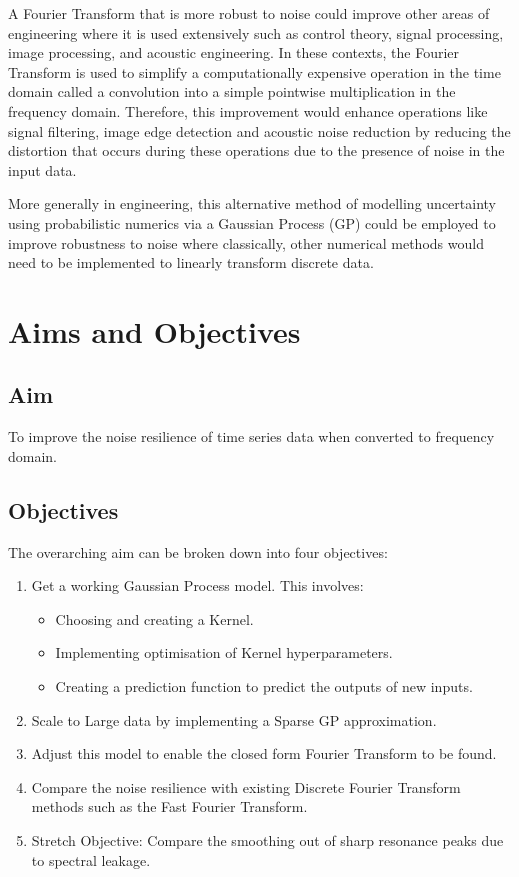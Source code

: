 \documentclass[12pt]{article}
\begin{document}
    A Fourier Transform that is more robust to noise could improve other areas of engineering where it is used extensively such as control theory, signal processing, image processing, and acoustic engineering.
    In these contexts, the Fourier Transform is used to simplify a computationally expensive operation in the time domain called a convolution into a simple pointwise multiplication in the frequency domain.
    Therefore, this improvement would enhance operations like signal filtering, image edge detection and acoustic noise reduction by reducing the distortion that occurs during these operations due to the presence of noise in the input data.


    More generally in engineering, this alternative method of modelling uncertainty using probabilistic numerics via a Gaussian Process (GP) could be employed to improve robustness to noise where classically, other numerical methods would need to be implemented to linearly transform discrete data.


    \section{Aims and Objectives}
    \subsection{Aim}
    To improve the noise resilience of time series data when converted to frequency domain.

    \subsection{Objectives}
    The overarching aim can be broken down into four objectives:
        \begin{enumerate}
            \item Get a working Gaussian Process model.
            This involves:
                \begin{itemize}
                    \item Choosing and creating a Kernel.
                    \item Implementing optimisation of Kernel hyperparameters. \label{item:nll}
                    \item Creating a prediction function to predict the outputs of new inputs. \label{item:predict}
                \end{itemize}
            \item Scale to Large data by implementing a Sparse GP approximation.
            \item Adjust this model to enable the closed form Fourier Transform to be found.
            \item Compare the noise resilience with existing Discrete Fourier Transform methods such as the Fast Fourier Transform.\label{noise-resiliance}
            \item Stretch Objective: Compare the smoothing out of sharp resonance peaks due to spectral leakage.\label{stretch-obj}
        \end{enumerate}
\end{document}
